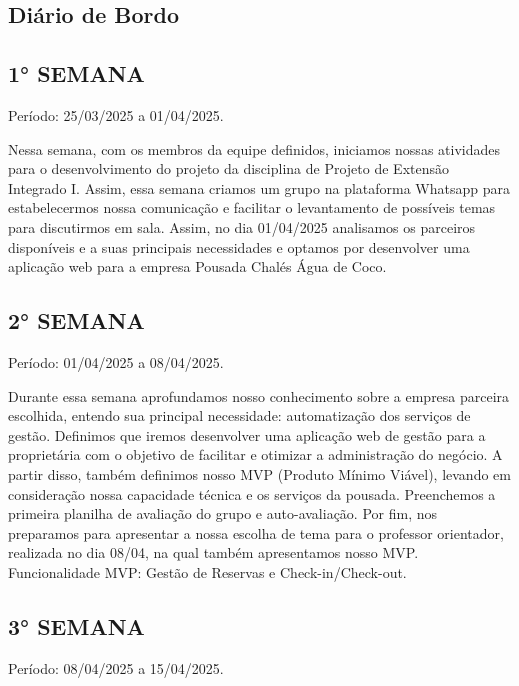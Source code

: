 \documentclass[
	12pt,				%
	openany,			%
	oneside,			%
	a4paper,			%
	english,			%
	french,				%
	spanish,			%
	brazil				%
	]{abntex2}
\begin{document}
\begin{apendicesenv}

\partapendices

\chapter{Diário de Bordo}


\section{1° SEMANA}
Período: 25/03/2025 a 01/04/2025.

Nessa semana, com os membros da equipe definidos, iniciamos nossas atividades para o desenvolvimento do projeto da disciplina de Projeto de Extensão Integrado I. Assim, essa semana criamos um grupo na plataforma Whatsapp para estabelecermos nossa comunicação e facilitar o levantamento de possíveis temas para discutirmos em sala. Assim, no dia 01/04/2025 analisamos os parceiros disponíveis e a suas principais necessidades e optamos por desenvolver uma aplicação web para a empresa Pousada Chalés Água de Coco. 

\section{2° SEMANA}
Período: 01/04/2025 a 08/04/2025.

Durante essa semana aprofundamos nosso conhecimento sobre a empresa parceira escolhida, entendo sua principal necessidade: automatização dos serviços de gestão.
Definimos que iremos desenvolver uma aplicação web de gestão para a proprietária com o objetivo de facilitar e otimizar a administração do negócio. A partir disso, também definimos nosso MVP (Produto Mínimo Viável), levando em consideração nossa capacidade técnica e os serviços da pousada. Preenchemos a primeira planilha de avaliação do grupo e auto-avaliação. Por fim, nos preparamos para apresentar a nossa escolha de tema para o professor orientador, realizada no dia 08/04, na qual também apresentamos nosso MVP.
Funcionalidade MVP: Gestão de Reservas e Check-in/Check-out. 	


\section{3° SEMANA}
Período: 08/04/2025 a 15/04/2025.


\end{apendicesenv}
\end{document}
